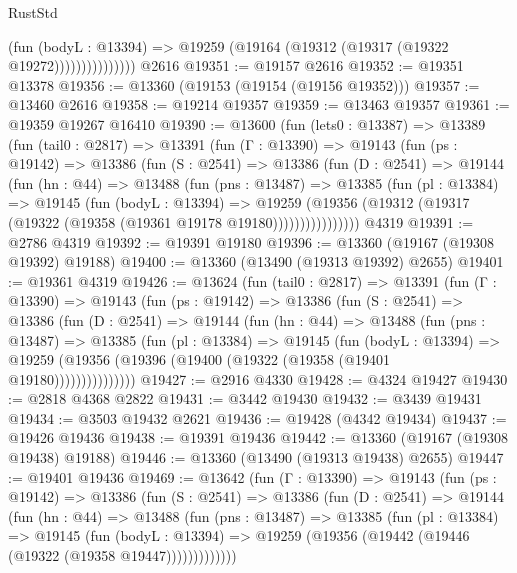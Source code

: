 \begin{lexlean}{RustStd}
\begin{coremodule}
                        (fun (bodyL : @13394) =>
                        @19259 (@19164 (@19312 (@19317 (@19322 @19272)))))))))))))))
    @2616
@19351 := @19157 @2616
@19352 := @19351 @13378
@19356 := @13360 (@19153 (@19154 (@19156 @19352)))
@19357 := @13460 @2616
@19358 := @19214 @19357
@19359 := @13463 @19357
@19361 := @19359 @19267 @16410
@19390 := @13600
    (fun (lets0 : @13387) =>
    @13389
      (fun (tail0 : @2817) =>
      @13391
        (fun (Γ : @13390) =>
        @19143
          (fun (ps : @19142) =>
          @13386
            (fun (S : @2541) =>
            @13386
              (fun (D : @2541) =>
              @19144
                (fun (hn : @44) =>
                @13488
                  (fun (pns : @13487) =>
                  @13385
                    (fun (pl : @13384) =>
                    @19145
                      (fun (bodyL : @13394) =>
                      @19259
                        (@19356
                          (@19312 (@19317 (@19322 (@19358 (@19361 @19178 @19180))))))))))))))))
    @4319
@19391 := @2786 @4319
@19392 := @19391 @19180
@19396 := @13360 (@19167 (@19308 @19392) @19188)
@19400 := @13360 (@13490 (@19313 @19392) @2655)
@19401 := @19361 @4319
@19426 := @13624
    (fun (tail0 : @2817) =>
    @13391
      (fun (Γ : @13390) =>
      @19143
        (fun (ps : @19142) =>
        @13386
          (fun (S : @2541) =>
          @13386
            (fun (D : @2541) =>
            @19144
              (fun (hn : @44) =>
              @13488
                (fun (pns : @13487) =>
                @13385
                  (fun (pl : @13384) =>
                  @19145
                    (fun (bodyL : @13394) =>
                    @19259 (@19356 (@19396 (@19400 (@19322 (@19358 (@19401 @19180)))))))))))))))
@19427 := @2916 @4330
@19428 := @4324 @19427
@19430 := @2818 @4368 @2822
@19431 := @3442 @19430
@19432 := @3439 @19431
@19434 := @3503 @19432 @2621
@19436 := @19428 (@4342 @19434)
@19437 := @19426 @19436
@19438 := @19391 @19436
@19442 := @13360 (@19167 (@19308 @19438) @19188)
@19446 := @13360 (@13490 (@19313 @19438) @2655)
@19447 := @19401 @19436
@19469 := @13642
    (fun (Γ : @13390) =>
    @19143
      (fun (ps : @19142) =>
      @13386
        (fun (S : @2541) =>
        @13386
          (fun (D : @2541) =>
          @19144
            (fun (hn : @44) =>
            @13488
              (fun (pns : @13487) =>
              @13385
                (fun (pl : @13384) =>
                @19145
                  (fun (bodyL : @13394) =>
                  @19259 (@19356 (@19442 (@19446 (@19322 (@19358 @19447)))))))))))))

\end{coremodule}
\end{lexlean}
